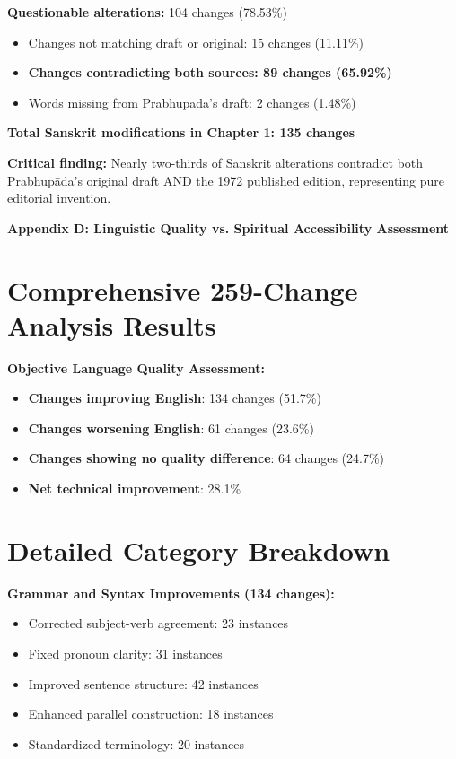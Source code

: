 \documentclass[11pt,twoside]{book}
\begin{document}
\textbf{\textbf{Questionable alterations:}} 104 changes (78.53\%)  
\begin{itemize}
\item Changes not matching draft or original: 15 changes (11.11\%)
\item \textbf{\textbf{Changes contradicting both sources: 89 changes (65.92\%)}}
\item Words missing from Prabhupāda's draft: 2 changes (1.48\%)
\end{itemize}

\textbf{\textbf{Total Sanskrit modifications in Chapter 1: 135 changes}}

\textbf{\textbf{Critical finding:}} Nearly two-thirds of Sanskrit alterations contradict both Prabhupāda's original draft AND the 1972 published edition, representing pure editorial invention.

\clearpage
\pagestyle{sectionopening}
\thispagestyle{sectionopening}
\markboth{}{}
\markright{}
\vspace*{0.25\textheight}
\begin{center}
{\Huge\bfseries Appendix D: Linguistic Quality vs. Spiritual Accessibility Assessment}
\end{center}
\newpage
\section*{Comprehensive 259-Change Analysis Results}
\label{sec:org4cb9737}

\textbf{\textbf{Objective Language Quality Assessment:}}
\begin{itemize}
\item \textbf{\textbf{Changes improving English}}: 134 changes (51.7\%)
\item \textbf{\textbf{Changes worsening English}}: 61 changes (23.6\%)
\item \textbf{\textbf{Changes showing no quality difference}}: 64 changes (24.7\%)
\item \textbf{\textbf{Net technical improvement}}: 28.1\%
\end{itemize}
\section*{Detailed Category Breakdown}
\label{sec:org27ae136}

\textbf{\textbf{Grammar and Syntax Improvements (134 changes):}}
\begin{itemize}
\item Corrected subject-verb agreement: 23 instances
\item Fixed pronoun clarity: 31 instances
\item Improved sentence structure: 42 instances
\item Enhanced parallel construction: 18 instances
\item Standardized terminology: 20 instances
\end{itemize}
\end{document}

